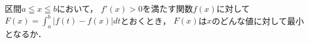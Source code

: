 \documentclass[../../main.tex]{subfiles}
\begin{document}
区間$a \leqq x \leqq b$において，
$f'(x)>0$を満たす関数$f(x)$に対して$\displaystyle F(x)=\int_a^b|f(t)-f(x)|dt$とおくとき，
$F(x)$は$x$のどんな値に対して最小となるか．
\end{document}
